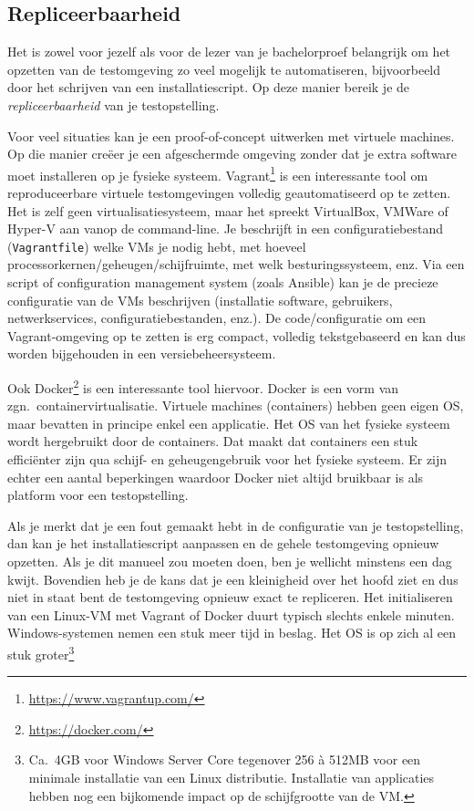 \subsection{Repliceerbaarheid}
\label{ssec:repliceerbaarheid}

Het is zowel voor jezelf als voor de lezer van je bachelorproef belangrijk om het opzetten van de testomgeving zo veel mogelijk te automatiseren, bijvoorbeeld door het schrijven van een installatiescript. Op deze manier bereik je de \textit{repliceerbaarheid} van je testopstelling.

Voor veel situaties kan je een proof-of-concept uitwerken met virtuele machines. Op die manier creëer je een afgeschermde omgeving zonder dat je extra software moet installeren op je fysieke systeem. Vagrant\footnote{\url{https://www.vagrantup.com/}} is een interessante tool om reproduceerbare virtuele testomgevingen volledig geautomatiseerd op te zetten. Het is zelf geen virtualisatiesysteem, maar het spreekt VirtualBox, VMWare of Hyper-V aan vanop de command-line. Je beschrijft in een configuratiebestand (\texttt{Vagrantfile}) welke VMs je nodig hebt, met hoeveel processorkernen/geheugen/schijfruimte, met welk besturingssysteem, enz. Via een script of configuration management system (zoals Ansible) kan je de precieze configuratie van de VMs beschrijven (installatie software, gebruikers, netwerkservices, configuratiebestanden, enz.). De code/configuratie om een Va\-grant-\-omgeving op te zetten is erg compact, volledig tekstgebaseerd en kan dus worden bijgehouden in een versiebeheersysteem.

Ook Docker\footnote{\url{https://docker.com/}} is een interessante tool hiervoor. Docker is een vorm van zgn.~containervirtualisatie. Virtuele machines (containers) hebben geen eigen OS, maar bevatten in principe enkel een applicatie. Het OS van het fysieke systeem wordt hergebruikt door de containers. Dat maakt dat containers een stuk efficiënter zijn qua schijf- en geheugengebruik voor het fysieke systeem. Er zijn echter een aantal beperkingen waardoor Docker niet altijd bruikbaar is als platform voor een testopstelling.

Als je merkt dat je een fout gemaakt hebt in de configuratie van je testopstelling, dan kan je het installatiescript aanpassen en de gehele testomgeving opnieuw opzetten. Als je dit manueel zou moeten doen, ben je wellicht minstens een dag kwijt. Bovendien heb je de kans dat je een kleinigheid over het hoofd ziet en dus niet in staat bent de testomgeving opnieuw exact te repliceren. Het initialiseren van een Linux-VM met Vagrant of Docker duurt typisch slechts enkele minuten. Windows-systemen nemen een stuk meer tijd in beslag. Het OS is op zich al een stuk groter\footnote{Ca.~4GB voor Windows Server Core tegenover 256 à 512MB voor een minimale installatie van een Linux distributie. Installatie van applicaties hebben nog een bijkomende impact op de schijfgrootte van de VM.}

